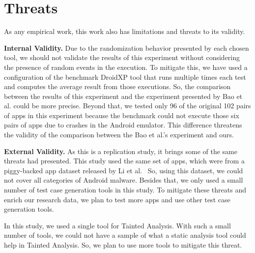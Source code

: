 \section{Threats}

As any empirical work, this work also has limitations and threats to its validity.

\textbf{Internal Validity.} Due to the randomization behavior presented by each chosen tool, we should not validate the results of this experiment without considering the presence of random events in the execution. To mitigate this, we have used a configuration of the benchmark DroidXP tool that runs multiple times each test and computes the average result from those executions. So, the comparison between the results of this experiment and the experiment presented by Bao et al. could be more precise. Beyond that, we tested only 96 of the original 102 pairs of apps in this experiment because the benchmark could not execute those six pairs of apps due to crashes in the Android emulator. This difference threatens the validity of the comparison between the Bao et al.'s experiment and ours.

\textbf{External Validity.} As this is a replication study, it brings some of the same threats \blls had presented. This study used the same set of apps, which were from a piggy-backed app dataset released by Li et al.~\cite{li2017understanding} So, using this dataset, we could not cover all categories of Android malware. Besides that, we only used a small number of test case generation tools in this study. To mitigate these threats and enrich our research data, we plan to test more apps and use other test case generation tools.

In this study, we used a single tool for Tainted Analysis. With such a small number of tools, we could not have a sample of what a static analysis tool could help in Tainted Analysis. So, we plan to use more tools to mitigate this threat.